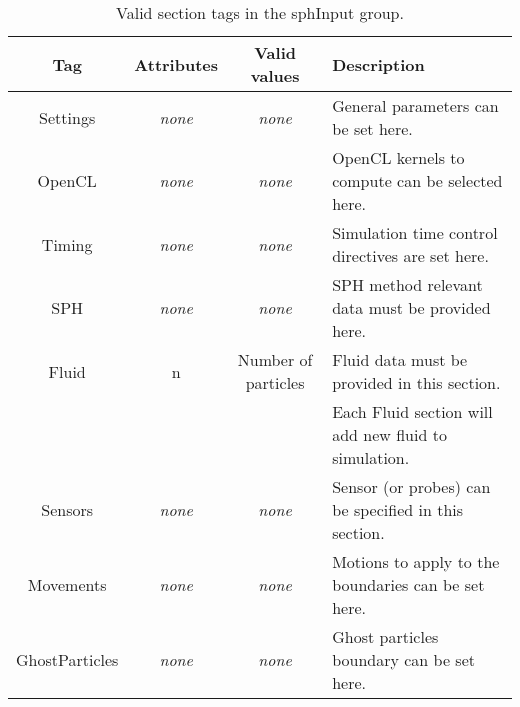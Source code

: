 \begin{table}[h!b!p!]\small
	\centering
	\begin{tabular}{| c | c | c | l | }
		\hline
		\cellcolor[rgb]{0.7,0.7,0.7}Tag & \cellcolor[rgb]{0.7,0.7,0.7}Attributes & \cellcolor[rgb]{0.7,0.7,0.7}Valid values & \cellcolor[rgb]{0.7,0.7,0.7}Description \\
		\hline
		Settings       & \textit{none} & \textit{none}       & General \NAME parameters can be set here. \\
		\hline
		OpenCL         & \textit{none} & \textit{none}       & OpenCL kernels to compute can be selected here. \\
		\hline
		Timing         & \textit{none} & \textit{none}       & Simulation time control directives are set here. \\
		\hline
		SPH            & \textit{none} & \textit{none}       & SPH method relevant data must be provided here. \\
		\hline
		Fluid          & n             & Number of particles & Fluid data must be provided in this section. \\
		               &               &                     & Each Fluid section will add new fluid to simulation. \\
		\hline
		Sensors        & \textit{none} & \textit{none}       & Sensor (or probes) can be specified in this section. \\
		\hline
		Movements      & \textit{none} & \textit{none}       & Motions to apply to the boundaries can be set here. \\
		\hline
		GhostParticles & \textit{none} & \textit{none}       & Ghost particles boundary can be set here. \\
		\hline
	\end{tabular}
	\caption{Valid section tags in the sphInput group.}
	\label{tables:caseSetup:XML:Groups}
\end{table}
%
